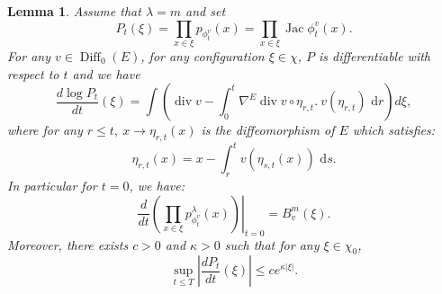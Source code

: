 \documentclass[11pt,a4paper]{amsart}
\newtheorem{Lemma}{Lemma}
\begin{document}
\begin{Lemma}
  \label{lem:1}
  Assume that $\lambda=m$ and set
  \begin{equation*}
    P_t(\xi)=\prod_{x\in \xi} p_{\phi_t^v}(x)=\prod_{x\in \xi} {\operatorname{Jac}} \phi_t^v(x).
  \end{equation*}
  For any $v\in {\operatorname{Diff}}_0(E)$, for any configuration $\xi \in \chi$, $P$
  is differentiable with respect to $t$ and we have
  \begin{equation*}
    \frac{d \log P_t}{dt}(\xi)  =\int \left(  {\operatorname{div}} v -\int_0^t
      \nabla^E {\operatorname{div}} v \circ \eta_{r,t} .\ v(\eta_{r,t}) {\text{ d}} r \right) d\xi,
  \end{equation*}
  where for any $r\le t,\ x\rightarrow\eta_{r,t}(x)$ is the
  diffeomorphism of $E$ which satisfies:
  \begin{equation*}
    \eta_{r,t}(x)=x-\int_r^t v(\eta_{s,t}(x)){\text{ d}} s.
  \end{equation*}
  In particular for $t=0$, we have:
  \begin{equation}
    \frac{d}{dt}\left.\left(\prod_{x \in\xi}p^{\lambda}_{\phi_t^v}(x)\right)\right|_{t=0}=B^{m}_v(\xi).
  \end{equation}
  Moreover, there exists $c>0$ and $\kappa >0$ such that for any $\xi
  \in \chi_0$,
  \begin{equation}\label{eq:14}
    \sup_{t\le T} \left | \frac{d  P_t}{dt}(\xi)\right|\le c e^{\kappa |\xi|}.
  \end{equation}
\end{Lemma}
\end{document}
